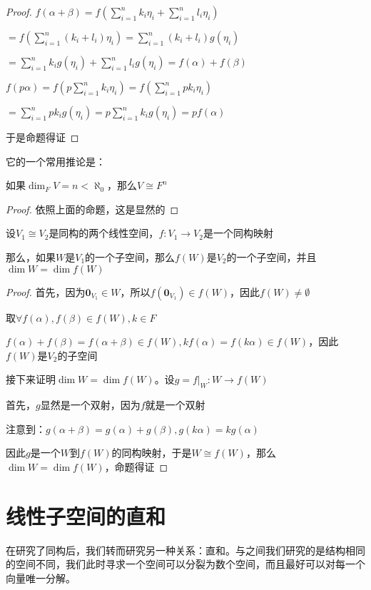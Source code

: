 \documentclass[12pt, a4paper, oneside, UTF8]{ctexbook}
\begin{document}
\begin{para}{0}
\begin{proof}
						$f(\alpha +\beta )=f(\sum\limits_{i=1}^{n} k_i \eta_i+\sum\limits_{i=1}^{n} l_i \eta_i)$

						$=f\left(\sum\limits_{i=1}^{n} (k_i+l_i) \eta_i\right)=\sum\limits_{i=1}^{n} (k_i+l_i) g(\eta_i)$

						$=\sum\limits_{i=1}^{n} k_i g(\eta_i)+\sum\limits_{i=1}^{n} l_i g(\eta_i)=f(\alpha )+f(\beta )$

						$f(p \alpha )=f(p\sum\limits_{i=1}^{n} k_i \eta_i)=f(\sum\limits_{i=1}^{n} pk_i \eta_i)$

						$=\sum\limits_{i=1}^{n} pk_i g(\eta_i)=p\sum\limits_{i=1}^{n} k_i g(\eta_i)=pf(\alpha )$

						于是命题得证
					\end{proof}
					它的一个常用推论是：
					\begin{corollary}{}{}
						如果$\dim_F V = n < \aleph_0$，那么$V \cong F^n$
					\end{corollary}
					\begin{proof}
						依照上面的命题，这是显然的
					\end{proof}
				\point{}
					\begin{proposition}
						设$V_1 \cong V_2$是同构的两个线性空间，$f:V_1 \to V_2$是一个同构映射
						
						那么，如果$W$是$V_1$的一个子空间，那么$f(W)$是$V_2$的一个子空间，并且$\dim W = \dim f(W)$
					\end{proposition}
					\begin{proof}
						首先，因为$\mathbf{0}_{V_1} \in W$，所以$f(\mathbf{0}_{V_1}) \in f(W)$，因此$f(W) \neq \emptyset$

						取$\forall f(\alpha ),f(\beta )\in f(W),k \in F$

						$f(\alpha )+f(\beta )=f(\alpha +\beta ) \in f(W),kf(\alpha )=f(k\alpha )\in f(W)$，因此$f(W)$是$V_2$的子空间

						接下来证明$\dim W = \dim f(W)$。设$g=f|_W : W \to f(W)$

						首先，$g$显然是一个双射，因为$f$就是一个双射

						注意到：$g(\alpha +\beta )=g(\alpha )+g(\beta ),g(k\alpha )=kg(\alpha )$

						因此$g$是一个$W$到$f(W)$的同构映射，于是$W \cong f(W)$，那么$\dim W=\dim f(W)$，命题得证
					\end{proof}
			\end{para}
	\section{线性子空间的直和}
		在研究了同构后，我们转而研究另一种关系：直和。与之间我们研究的是结构相同的空间不同，我们此时寻求一个空间可以分裂为数个空间，而且最好可以对每一个向量唯一分解。
		
\end{document}

